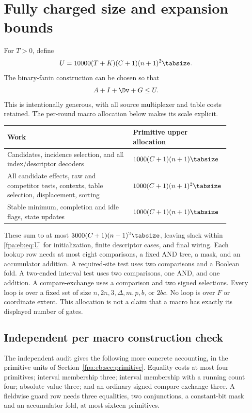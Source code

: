 \documentclass[11pt,a4paper]{article}
\numberwithin{equation}{section}
\begin{document}
\section{Fully charged size and expansion bounds}\label{fpa:eb:sec:cost}
For $T>0$, define
\begin{equation}\label{fpa:eb:eq:U}
U=10000(T+K)(C+1)(n+1)^2\tabsize.
\end{equation}
The binary-fanin construction can be chosen so that
\[
A+I+\Dv+G\leq U.
\]
This is intentionally generous, with all source multiplexer and table costs retained. The per-round macro allocation below makes its scale explicit.
\begin{center}\small
\begin{tabular}{@{}p{0.57\linewidth}p{0.34\linewidth}@{}}\toprule
Work & Primitive upper allocation\\\midrule
Candidates, incidence selection, and all index/descriptor decoders & $1000(C+1)(n+1)\tabsize$\\
All candidate effects, raw and competitor tests, contexts, table selection, displacement, sorting & $1000(C+1)(n+1)^2\tabsize$\\
Stable minimum, completion and idle flags, state updates & $1000(C+1)(n+1)\tabsize$\\\bottomrule
\end{tabular}
\end{center}
These sum to at most $3000(C+1)(n+1)^2\tabsize$, leaving slack within \eqref{fpa:eb:eq:U} for initialization, finite descriptor cases, and final wiring. Each lookup row needs at most eight comparisons, a fixed AND tree, a mask, and an accumulator addition. A required-site test uses two comparisons and a Boolean fold. A two-ended interval test uses two comparisons, one AND, and one addition. A compare-exchange uses a comparison and two signed selections. Every loop is over a fixed set of size $n,2n,3,\Delta,m,p,b$, or $2bc$. No loop is over $F$ or coordinate extent. This allocation is not a claim that a macro has exactly its displayed number of gates.

\subsection{Independent per macro construction check}
The independent audit gives the following more concrete accounting, in the primitive units of Section~\ref{fpa:eb:sec:primitive}. Equality costs at most four primitives; interval membership three; interval membership with a running count four; absolute value three; and an ordinary signed compare-exchange three. A fieldwise guard row needs three equalities, two conjunctions, a constant-bit mask and an accumulator fold, at most sixteen primitives.
\end{document}
